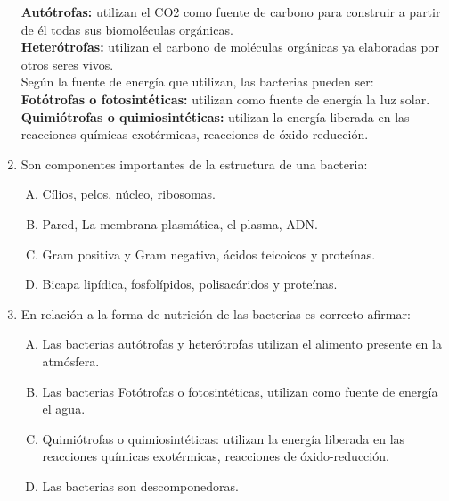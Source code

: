 \begin{enumerate}
\textbf{Autótrofas:} utilizan el CO2 como fuente de carbono para construir a partir de él todas sus biomoléculas orgánicas.\\

\textbf{Heterótrofas:} utilizan el carbono de moléculas orgánicas ya elaboradas por otros seres vivos.\\

Según la fuente de energía que utilizan, las bacterias pueden ser:\\

\textbf{Fotótrofas o fotosintéticas:} utilizan como fuente de energía la luz solar.\\


\textbf{Quimiótrofas o quimiosintéticas:} utilizan la energía liberada en las reacciones químicas exotérmicas, reacciones de óxido-reducción.


\item Son componentes importantes de la estructura de una bacteria:\label{bio-26}


\begin{enumerate}[(A)]
\item Cílios, pelos, núcleo, ribosomas.
\item Pared, La membrana plasmática, el plasma, ADN.
\item Gram positiva y Gram negativa, ácidos teicoicos y proteínas.
\item Bicapa lipídica, fosfolípidos, polisacáridos y proteínas.
\end{enumerate}



\item En relación a la forma de nutrición de las bacterias es correcto afirmar: \label{bio-27}


\begin{enumerate}[(A)]
\item Las bacterias autótrofas y heterótrofas utilizan el alimento presente en la atmósfera.
\item  Las bacterias Fotótrofas o fotosintéticas,  utilizan como fuente de energía el agua.
\item  Quimiótrofas o quimiosintéticas: utilizan la energía liberada en las reacciones químicas      exotérmicas, reacciones de óxido-reducción.
\item  Las bacterias son descomponedoras.
\end{enumerate}

\end{enumerate}

